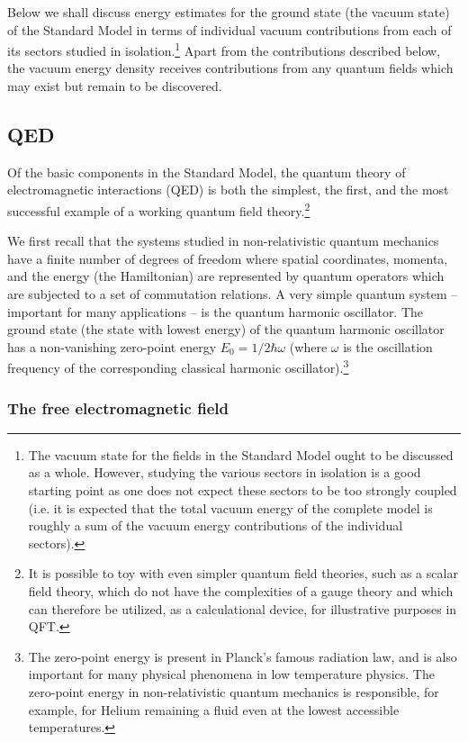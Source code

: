 \documentclass[12pt]{article}
\def\ss{\subsection}
\def\sss{\subsubsection}
\begin{document}
Below we shall discuss energy estimates for the ground state (the
vacuum state) of the Standard Model in terms of individual vacuum
contributions from each of its sectors studied in
isolation.\footnote{The vacuum state for the fields in the
Standard Model ought to be discussed as a whole. However, studying
the various sectors in isolation is a good starting point as one
does not expect these sectors to be too strongly coupled (i.e. it
is expected that the total vacuum energy of the complete model is
roughly a sum of the vacuum energy contributions of the individual
sectors).} Apart from the contributions described
below, the vacuum energy density receives contributions from any
quantum fields which may exist but remain to be discovered.

\ss{QED}
Of the basic components in the Standard Model, the quantum theory
of electromagnetic interactions (QED) is both the simplest, the
first, and the most successful example of a working quantum field
theory.\footnote{It is possible to toy with even simpler quantum
field theories, such as a scalar field theory, which do not have
the complexities of a gauge theory and which can therefore be
utilized, as a calculational device, for illustrative purposes in
QFT.} 

We first recall that the systems studied in non-relativistic
quantum mechanics have a finite number of degrees of freedom where
spatial coordinates, momenta, and the energy (the Hamiltonian) are
represented by quantum operators which are subjected to a set of
commutation relations. A very simple quantum system -- important
for many applications -- is the quantum harmonic oscillator. The
ground state (the state with lowest energy) of the quantum
harmonic oscillator has a non-vanishing zero-point energy $E_0 =
1/2 \hbar \omega$ (where $\omega$ is the oscillation frequency of
the corresponding classical harmonic oscillator).\footnote{The
zero-point energy is present in Planck's famous radiation law, and
is also important for many physical phenomena in low temperature
physics. The zero-point energy in non-relativistic quantum
mechanics is responsible, for example, for Helium remaining a
fluid even at the lowest accessible temperatures.}

\sss{The free electromagnetic field}
\end{document}
